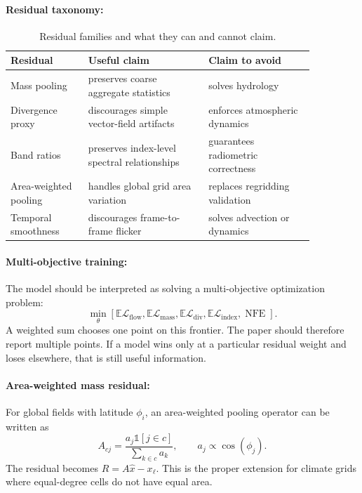 \documentclass{article}
\begin{document}
\paragraph{Residual taxonomy:}

\begin{table}[t]
\centering
\caption{Residual families and what they can and cannot claim.}
\begin{tabular}{@{}p{0.22\linewidth}p{0.34\linewidth}p{0.30\linewidth}@{}}
\toprule
\textbf{Residual} & \textbf{Useful claim} & \textbf{Claim to avoid}\\
\midrule
Mass pooling & preserves coarse aggregate statistics & solves hydrology\\
Divergence proxy & discourages simple vector-field artifacts & enforces atmospheric dynamics\\
Band ratios & preserves index-level spectral relationships & guarantees radiometric correctness\\
Area-weighted pooling & handles global grid area variation & replaces regridding validation\\
Temporal smoothness & discourages frame-to-frame flicker & solves advection or dynamics\\
\bottomrule
\end{tabular}
\end{table}

\paragraph{Multi-objective training:}

The model should be interpreted as solving a multi-objective optimization problem:
\begin{equation}
  \min_{\theta}\left[
  \mathbb{E}\mathcal{L}_{\text{flow}},
  \mathbb{E}\mathcal{L}_{\text{mass}},
  \mathbb{E}\mathcal{L}_{\text{div}},
  \mathbb{E}\mathcal{L}_{\text{index}},
  \operatorname{NFE}
  \right].
\end{equation}
A weighted sum chooses one point on this frontier. The paper should therefore report multiple points. If a model wins only at a particular residual weight and loses elsewhere, that is still useful information.

\paragraph{Area-weighted mass residual:}

For global fields with latitude $\phi_i$, an area-weighted pooling operator can be written as
\begin{equation}
  A_{cj}=\frac{a_j\mathbb{1}[j\in c]}{\sum_{k\in c}a_k},\qquad a_j\propto\cos(\phi_j).
\end{equation}
The residual becomes $R=A\hat{x}-x_{\ell}$. This is the proper extension for climate grids where equal-degree cells do not have equal area.
\end{document}
